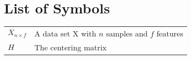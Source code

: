 \chapter*{List of Symbols}

\begin{table}[htbp]
	\begin{tabularx}{\textwidth}{XX}
		$X_{n \times f}$ & A data set X with $n$ samples and $f$ features \bigstrut\\
		$H$ & The centering matrix \bigstrut\\
	\end{tabularx}
\end{table}
